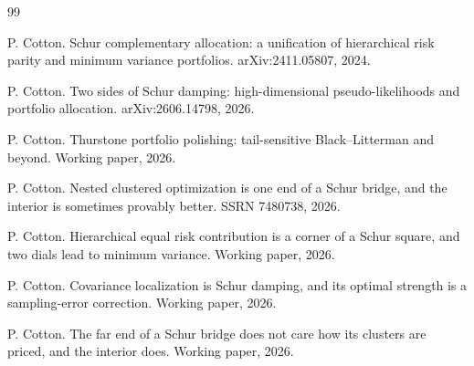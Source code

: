 \documentclass[11pt]{article}
\begin{document}
\begin{thebibliography}{99}

P. Cotton.
Schur complementary allocation: a unification of hierarchical risk parity and
minimum variance portfolios.
arXiv:2411.05807, 2024.

P. Cotton.
Two sides of Schur damping: high-dimensional pseudo-likelihoods and portfolio
allocation.
arXiv:2606.14798, 2026.

P. Cotton.
Thurstone portfolio polishing: tail-sensitive Black--Litterman and beyond.
Working paper, 2026.

P. Cotton.
Nested clustered optimization is one end of a Schur bridge, and the interior is
sometimes provably better.
SSRN 7480738, 2026.

P. Cotton.
Hierarchical equal risk contribution is a corner of a Schur square, and two
dials lead to minimum variance.
Working paper, 2026.

P. Cotton.
Covariance localization is Schur damping, and its optimal strength is a
sampling-error correction.
Working paper, 2026.

P. Cotton.
The far end of a Schur bridge does not care how its clusters are priced, and the
interior does.
Working paper, 2026.

\end{thebibliography}
\end{document}
